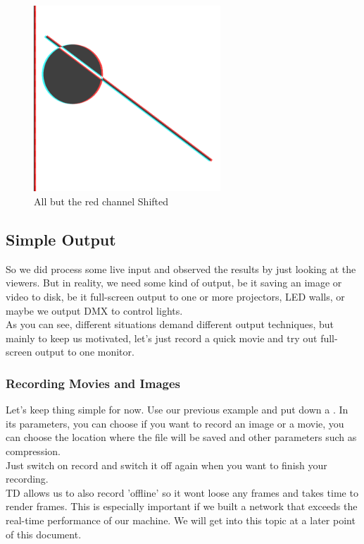 \begin{figure}[H]
	\centering
	\includegraphics[width=7cm]{img/R_shift.PNG}
	\caption[All but the red channel Shifted]
	{All but the red channel Shifted}
	\label{fig:label}
\end{figure}


\subsection{Simple Output}
So we did process some live input and observed the results by just looking at the \OPs viewers. But in reality, we need some kind of output, be it saving an image or video to disk, be it full-screen output to one or more projectors, LED walls, or maybe we output DMX to control lights.\\
As you can see, different situations demand different output techniques, but mainly to keep us motivated, let's just record a quick movie and try out full-screen output to one monitor.\\

\subsubsection{Recording Movies and Images}

Let's keep thing simple for now. Use our previous example and put down a . In its parameters, you can choose if you want to record an image or a movie, you can choose the location where the file will be saved and other parameters such as compression.\\
Just switch on record and switch it off again when you want to finish your recording.\\
TD allows us to also record 'offline' so it wont loose any frames and takes time to render frames. This is especially important if we built a network that exceeds the real-time performance of our machine. We will get into this topic at a later point of this document.

